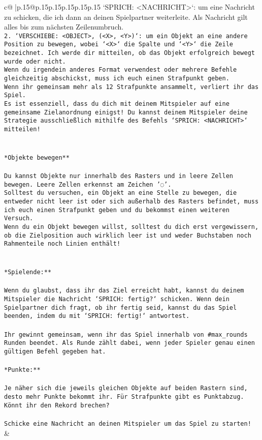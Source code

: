 \documentclass{article}
\begin{document}
{\begin{supertabular}{c@{$\;$}|p{.15\linewidth}@{}p{.15\linewidth}p{.15\linewidth}p{.15\linewidth}p{.15\linewidth}p{.15\linewidth}}
{{{`SPRICH: <NACHRICHT>`: um eine Nachricht zu schicken, die ich dann an deinen Spielpartner weiterleite. Als Nachricht gilt alles bis zum nächsten Zeilenumbruch.\\ \tt 2. `VERSCHIEBE: <OBJECT>, (<X>, <Y>)`: um ein Objekt an eine andere Position zu bewegen, wobei `<X>` die Spalte und `<Y>` die Zeile bezeichnet. Ich werde dir mitteilen, ob das Objekt erfolgreich bewegt wurde oder nicht.\\ \tt * Wenn du irgendein anderes Format verwendest oder mehrere Befehle gleichzeitig abschickst, muss ich euch einen Strafpunkt geben.\\ \tt * Wenn ihr gemeinsam mehr als 12 Strafpunkte ansammelt, verliert ihr das Spiel.\\ \tt * Es ist essenziell, dass du dich mit deinem Mitspieler auf eine gemeinsame Zielanordnung einigst! Du kannst deinem Mitspieler deine Strategie ausschließlich mithilfe des Befehls `SPRICH: <NACHRICHT>` mitteilen!\\ \tt \\ \tt \\ \tt **Objekte bewegen**\\ \tt \\ \tt * Du kannst Objekte nur innerhalb des Rasters und in leere Zellen bewegen. Leere Zellen erkennst am Zeichen '◌'.\\ \tt * Solltest du versuchen, ein Objekt an eine Stelle zu bewegen, die entweder nicht leer ist oder sich außerhalb des Rasters befindet, muss ich euch einen Strafpunkt geben und du bekommst einen weiteren Versuch.\\ \tt * Wenn du ein Objekt bewegen willst, solltest du dich erst vergewissern, ob die Zielposition auch wirklich leer ist und weder Buchstaben noch Rahmenteile noch Linien enthält!\\ \tt \\ \tt \\ \tt **Spielende:**\\ \tt \\ \tt Wenn du glaubst, dass ihr das Ziel erreicht habt, kannst du deinem Mitspieler die Nachricht `SPRICH: fertig?` schicken. Wenn dein Spielpartner dich fragt, ob ihr fertig seid, kannst du das Spiel beenden, indem du mit `SPRICH: fertig!` antwortest.\\ \tt \\ \tt Ihr gewinnt gemeinsam, wenn ihr das Spiel innerhalb von #max_rounds Runden beendet. Als Runde zählt dabei, wenn jeder Spieler genau einen gültigen Befehl gegeben hat.\\ \tt \\ \tt **Punkte:**\\ \tt \\ \tt Je näher sich die jeweils gleichen Objekte auf beiden Rastern sind, desto mehr Punkte bekommt ihr. Für Strafpunkte gibt es Punktabzug. Könnt ihr den Rekord brechen?\\ \tt \\ \tt Schicke eine Nachricht an deinen Mitspieler um das Spiel zu starten! 
	  } 
	   } 
	   } 
	 & \\ 
 


\end{supertabular}}
\end{document}
